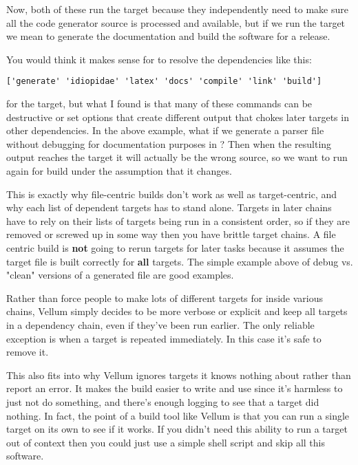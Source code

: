 Now, both of these run the  target because they independently
need to make sure all the code generator source is processed and available,
but if we run the  target we mean to generate the documentation
and build the software for a release.

You would think it makes sense for  to resolve the dependencies 
like this: 

\verb|['generate' 'idiopidae' 'latex' 'docs' 'compile' 'link' 'build']|

for the  target, but what I found is that many of these commands
can be destructive or set options that create different output that chokes later
targets in other dependencies.  In the above example, what if we generate a
parser file without debugging for documentation purposes in ?  Then
when the resulting output reaches the  target it will actually be
the wrong source, so we want to run  again for build under the
assumption that it changes.

This is exactly why file-centric builds don't work as well as target-centric,
and why each list of dependent targets has to stand alone.  Targets in
later chains have to rely on their lists of targets being run in a
consistent order, so if they are removed or screwed up in some way then you
have brittle target chains.  A file centric build is {\bf not} going to
rerun targets for later tasks because it assumes the target file is built
correctly for {\bf all} targets.  The simple example above of debug vs.
"clean" versions of a generated file are good examples.

Rather than force people to make lots of different targets for inside various
chains, Vellum simply decides to be more verbose or explicit and keep all
targets in a dependency chain, even if they've been run earlier.  The only
reliable exception is when a target is repeated immediately.  In this case it's
safe to remove it.

This also fits into why Vellum ignores targets it knows nothing about rather
than report an error.  It makes the build easier to write and use since it's
harmless to just not do something, and there's enough logging to see that a
target did nothing.  In fact, the point of a build tool like Vellum is that you
can run a single target on its own to see if it works.  If you didn't need this
ability to run a target out of context then you could just use a simple shell
script and skip all this software.


